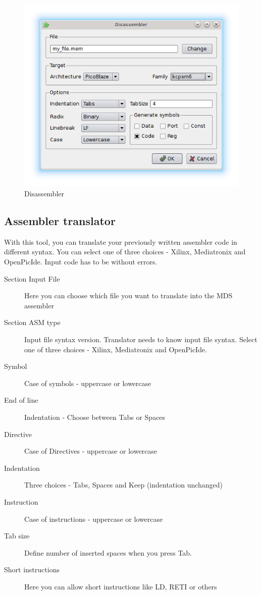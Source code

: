         \begin{figure}[h]
            \centering
            \includegraphics[width=.5\textwidth]{img/disassembler_window.png}
            \caption{Disassembler}
        \end{figure}

    \subsection{Assembler translator}
        With this tool, you can translate your previously written assembler code in different syntax.
        You can select one of three choices - Xilinx, Mediatronix and OpenPicIde. Input code has to be without
        errors.
        \begin{description}
            \item[Section Input File] Here you can choose which file you want to translate into the MDS assembler
            \item[Section ASM type] Input file syntax version. Translator needs to know input file syntax. Select one of
                three choices - Xilinx, Mediatronix and OpenPicIde.
            \item[Symbol] Case of symbols - uppercase or lowercase
            \item[End of line] Indentation - Choose between Tabs or Spaces
            \item[Directive] Case of Directives - uppercase or lowercase
            \item[Indentation] Three choices - Tabs, Spaces and Keep (indentation unchanged)
            \item[Instruction] Case of instructions - uppercase or lowercase
            \item[Tab size]  Define number of inserted spaces when you press Tab.
            \item[Short instructions] Here you can allow short instructions like LD, RETI or others
        \end{description}

